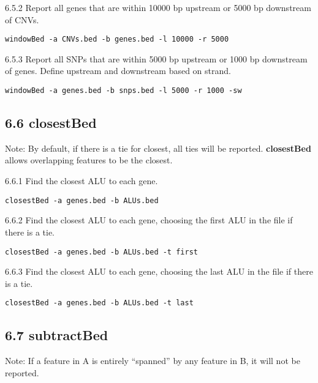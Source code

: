 \documentclass[letterpaper,10pt,english]{sphinxmanual}
\begin{document}
6.5.2 Report all genes that are within 10000 bp upstream or 5000 bp downstream of
CNVs.

\begin{Verbatim}[commandchars=\\\{\}]
windowBed -a CNVs.bed -b genes.bed -l 10000 -r 5000
\end{Verbatim}

6.5.3 Report all SNPs that are within 5000 bp upstream or 1000 bp downstream of genes.
Define upstream and downstream based on strand.

\begin{Verbatim}[commandchars=\\\{\}]
windowBed -a genes.bed -b snps.bed -l 5000 -r 1000 -sw
\end{Verbatim}


\subsection{6.6 closestBed}
\label{content/example-usage:closestbed}
Note: By default, if there is a tie for closest, all ties will be reported. \textbf{closestBed} allows overlapping
features to be the closest.

6.6.1 Find the closest ALU to each gene.

\begin{Verbatim}[commandchars=\\\{\}]
closestBed -a genes.bed -b ALUs.bed
\end{Verbatim}

6.6.2 Find the closest ALU to each gene, choosing the first ALU in the file if there is a
tie.

\begin{Verbatim}[commandchars=\\\{\}]
closestBed -a genes.bed -b ALUs.bed -t first
\end{Verbatim}

6.6.3 Find the closest ALU to each gene, choosing the last ALU in the file if there is a
tie.

\begin{Verbatim}[commandchars=\\\{\}]
closestBed -a genes.bed -b ALUs.bed -t last
\end{Verbatim}


\subsection{6.7 subtractBed}
\label{content/example-usage:subtractbed}
Note: If a feature in A is entirely ``spanned'' by any feature in B, it will not be reported.
\end{document}
